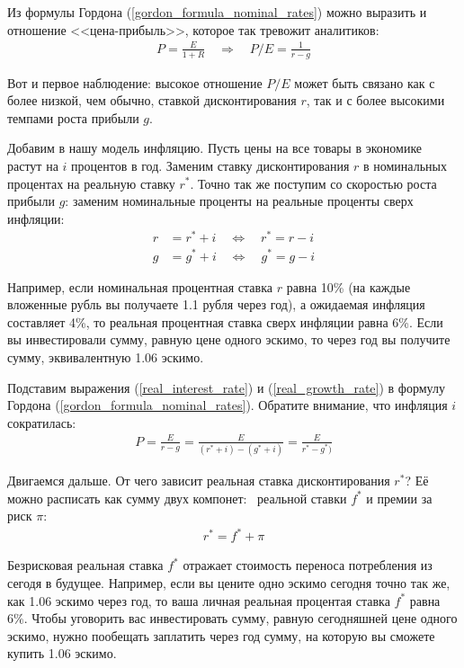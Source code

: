 Из формулы Гордона  (\ref{gordon_formula_nominal_rates}) можно выразить и отношение <<цена-прибыль>>, которое так тревожит аналитиков:
\begin{align*}
P = \frac{E}{1 + R} \quad \Rightarrow \quad P/E = \frac{1}{r - g}
\end{align*}

Вот и первое наблюдение: высокое отношение $P/E$ может быть связано как с более низкой, чем обычно, ставкой дисконтирования $r$, так и с более высокими темпами роста прибыли $g$.

Добавим в нашу модель инфляцию. Пусть цены на все товары в экономике растут на $i$ процентов в год. Заменим ставку дисконтирования $r$ в номинальных процентах на реальную ставку $r^*$. Точно так же поступим со скоростью роста прибыли $g$: заменим номинальные проценты на реальные проценты сверх инфляции:
\begin{align}
r &= r^* + i \quad \Leftrightarrow \quad r^* = r - i 
\label{real_interest_rate}
\\
g &= g^* + i \quad \Leftrightarrow \quad g^* = g - i
\label{real_growth_rate}
\end{align}

Например, если номинальная процентная ставка $r$ равна 10\% (на каждые вложенные рубль вы получаете 1.1 рубля через год), а ожидаемая инфляция составляет 4\%, то реальная процентная ставка сверх инфляции равна 6\%. Если вы инвестировали сумму, равную цене одного эскимо, то через год вы получите сумму, эквивалентную 1.06 эскимо.

Подставим выражения (\ref{real_interest_rate}) и  (\ref{real_growth_rate}) в формулу Гордона  (\ref{gordon_formula_nominal_rates}). Обратите внимание, что инфляция $i$ сократилась:
\begin{align*}
P = \frac{E}{r - g} = \frac{E}{(r^* + i) - (g^* + i)} =  \frac{E}{r^* - g^*)} 
\end{align*}

Двигаемся дальше. От чего зависит реальная ставка дисконтирования $r^*$? Её можно расписать как сумму двух компонет: \ реальной ставки $f^*$ и премии за риск $\pi$:
\begin{align*}
r^* = f^* + \pi
\end{align*}

Безрисковая реальная ставка $f^*$ отражает стоимость переноса потребления из сегодя в будущее. Например, если вы цените одно эскимо сегодня точно так же, как 1.06 эскимо через год, то ваша личная реальная процентая ставка $f^*$ равна $6\%$. Чтобы уговорить вас инвестировать сумму, равную сегодняшней цене одного эскимо, нужно пообещать заплатить через год сумму, на которую вы сможете купить 1.06 эскимо.

